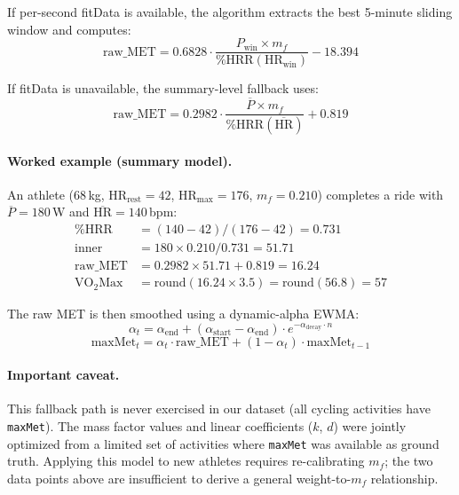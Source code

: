 \documentclass[11pt,a4paper]{article}
\begin{document}
If per-second fitData is available, the algorithm extracts the best 5-minute sliding window and computes:
\begin{equation}
\text{raw\_MET} = 0.6828 \cdot \frac{P_{\text{win}} \times m_f}{\%\text{HRR}(\text{HR}_{\text{win}})} - 18.394
\label{eq:cyc-windowed}
\end{equation}

If fitData is unavailable, the summary-level fallback uses:
\begin{equation}
\text{raw\_MET} = 0.2982 \cdot \frac{\overline{P} \times m_f}{\%\text{HRR}(\overline{\text{HR}})} + 0.819
\label{eq:cyc-summary}
\end{equation}

\paragraph{Worked example (summary model).}
An athlete (68\,kg, HR$_{\text{rest}} = 42$, HR$_{\text{max}} = 176$, $m_f = 0.210$) completes a ride with $\overline{P} = 180$\,W and $\overline{\text{HR}} = 140$\,bpm:
\begin{align*}
\%\text{HRR} &= (140 - 42) / (176 - 42) = 0.731 \\
\text{inner} &= 180 \times 0.210 / 0.731 = 51.71 \\
\text{raw\_MET} &= 0.2982 \times 51.71 + 0.819 = 16.24 \\
\text{VO}_2\text{Max} &= \text{round}(16.24 \times 3.5) = \text{round}(56.8) = 57
\end{align*}

The raw MET is then smoothed using a dynamic-alpha EWMA:
\begin{equation}
\alpha_t = \alpha_{\text{end}} + (\alpha_{\text{start}} - \alpha_{\text{end}}) \cdot e^{-\alpha_{\text{decay}} \cdot n}
\label{eq:cyc-dynamic-alpha}
\end{equation}
\begin{equation}
\text{maxMet}_t = \alpha_t \cdot \text{raw\_MET} + (1 - \alpha_t) \cdot \text{maxMet}_{t-1}
\end{equation}

\paragraph{Important caveat.}
This fallback path is never exercised in our dataset (all cycling activities have \texttt{maxMet}).
The mass factor values and linear coefficients ($k$, $d$) were jointly optimized from a limited set of activities where \texttt{maxMet} was available as ground truth.
Applying this model to new athletes requires re-calibrating $m_f$; the two data points above are insufficient to derive a general weight-to-$m_f$ relationship.
\end{document}
